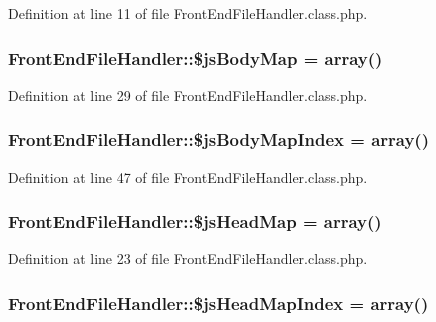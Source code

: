 Definition at line 11 of file Front\+End\+File\+Handler.\+class.\+php.

\hypertarget{classFrontEndFileHandler_ad03de614a088bc386c393543a3cd9aed}{
\subsubsection[{\$js\+Body\+Map}]{\setlength{\rightskip}{0pt plus 5cm}Front\+End\+File\+Handler\+::\$js\+Body\+Map = array()}}\label{classFrontEndFileHandler_ad03de614a088bc386c393543a3cd9aed}


Definition at line 29 of file Front\+End\+File\+Handler.\+class.\+php.

\hypertarget{classFrontEndFileHandler_aba61415d3f993f1f6b9cddc0024f50b1}{
\subsubsection[{\$js\+Body\+Map\+Index}]{\setlength{\rightskip}{0pt plus 5cm}Front\+End\+File\+Handler\+::\$js\+Body\+Map\+Index = array()}}\label{classFrontEndFileHandler_aba61415d3f993f1f6b9cddc0024f50b1}


Definition at line 47 of file Front\+End\+File\+Handler.\+class.\+php.

\hypertarget{classFrontEndFileHandler_ab434f9c8c874aaf8186e259dff95d116}{
\subsubsection[{\$js\+Head\+Map}]{\setlength{\rightskip}{0pt plus 5cm}Front\+End\+File\+Handler\+::\$js\+Head\+Map = array()}}\label{classFrontEndFileHandler_ab434f9c8c874aaf8186e259dff95d116}


Definition at line 23 of file Front\+End\+File\+Handler.\+class.\+php.

\hypertarget{classFrontEndFileHandler_a151a55b31ffaec411a86b7f618eed4ac}{
\subsubsection[{\$js\+Head\+Map\+Index}]{\setlength{\rightskip}{0pt plus 5cm}Front\+End\+File\+Handler\+::\$js\+Head\+Map\+Index = array()}}\label{classFrontEndFileHandler_a151a55b31ffaec411a86b7f618eed4ac}


